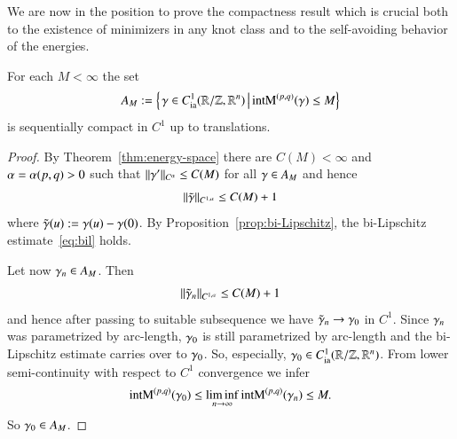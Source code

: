 We are now in the position to prove the
compactness result which is crucial both to
the existence of minimizers
in any knot class
and to the self-avoiding behavior of the energies.

\begin{proposition}\label{prop:sequentiallycompact}
 For each $M< \infty$ the set
 \begin{equation*}
  A_M:=\left\{\left.\gamma \in C_{\mathrm{ia}}^{1}(\mathbb R / \mathbb Z, \mathbb R^n)\,\right| 
  \mathrm{intM}^{(p,q)}(\gamma) \leq M\right\}
 \end{equation*}
 is sequentially compact in $C^1$ up to translations.
\end{proposition}

\begin{proof}
 By Theorem~\ref{thm:energy-space}
 there are $C(M)< \infty$ and $\alpha=\alpha(p,q)>0$ such that
  $\|{\gamma}'\|_{C^\alpha} \leq C(M)$
 for all $\gamma\in A_M$ and hence
 \begin{equation*}
  \|\tilde {\gamma}\|_{C^{1,\alpha}} \leq C(M) + 1
 \end{equation*}
 where $\tilde {\gamma} (u) := \gamma(u)-\gamma(0)$.
 By Proposition~\ref{prop:bi-Lipschitz},
 the bi-Lipschitz estimate~\eqref{eq:bil} holds.
 
 Let now $\gamma_n \in A_M$. Then
 \begin{equation*}
  \|\tilde {\gamma}_n\|_{C^{1,\alpha}} \leq C(M) + 1
 \end{equation*}
 and hence after passing to suitable subsequence we have
  $\tilde {\gamma}_n \rightarrow \gamma_{0}$
 in $C^1$. Since $\gamma_n$ was parametrized by arc-length,
 $\gamma_0$ is still parametrized by arc-length and
 the bi-Lipschitz estimate carries over to $\gamma_{0}$.
 So, especially, $\gamma_{0} \in C_{\mathrm{ia}}^{1}(\mathbb R / \mathbb Z, \mathbb R^n)$.
 From lower semi-continuity with respect 
 to $C^1$ convergence we infer
 \begin{equation*}
  \mathrm{intM}^{(p,q)}(\gamma_0) \leq \liminf_{n\rightarrow \infty} \mathrm{intM}^{(p,q)}(\gamma_n) \leq M.
 \end{equation*}
 So $\gamma_0 \in A_M$.
\end{proof}

